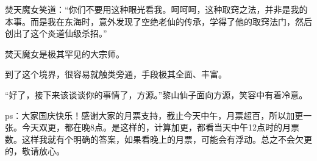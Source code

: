 \begin{this_body}
焚天魔女笑道：“你们不要用这种眼光看我。呵呵呵，这种取窍之法，并非是我的本事。而是我在东海时，意外发现了空绝老仙的传承，学得了他的取窍法门，然后创出了这个炎道仙级杀招。”

焚天魔女是极其罕见的大宗师。

到了这个境界，很容易就触类旁通，手段极其全面、丰富。

“好了，接下来该谈谈你的事情了，方源。”黎山仙子面向方源，笑容中有着冷意。

ps：大家国庆快乐！感谢大家的月票支持，截止今天中午，月票超百，所以加更一张。今天双更，都在晚8点。是这样的，计算加更，都看当天中午12点时的月票数。这样我就有个明确的答案，如果看晚上的月票，可能会有浮动。总之不会欠更的，敬请放心。

\end{this_body}

